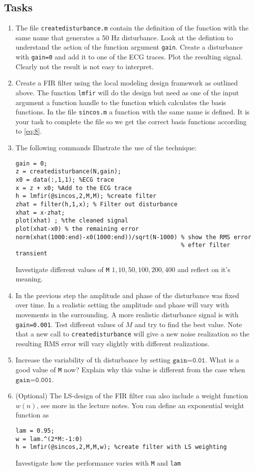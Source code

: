 \documentclass[12pt]{article}
\begin{document}
\subsection{Tasks}
\label{sec:tasks-1}
\begin{enumerate}
\item The file \texttt{createdisturbance.m} contain the definition of the
function with the same name that generates a 50 Hz disturbance. Look
at the defintion to understand the action of the function argument
\texttt{gain}. Create a disturbance with \texttt{gain=0}  and add
it to one of the ECG traces. Plot the resulting signal. Clearly not
the result is not easy to interpret. 
\item Create a FIR filter using the local modeling design framework as
  outlined above. The function \texttt{lmfir} will do the design but
  need as one of the input argument a function handle to the function
  which calculates the basis functions. In the file \texttt{sincos.m}
  a function with the same name is defined. It is your task to
  complete the file so we get the correct basis functions according to
  \eqref{eq:8}. 
\item The following commands Illustrate the use of the technique:
\begin{verbatim}
gain = 0;
z = createdisturbance(N,gain);
x0 = data(:,1,1); %ECG trace
x = z + x0; %Add to the ECG trace
h = lmfir(@sincos,2,M,M); %create filter
zhat = filter(h,1,x); % Filter out disturbance
xhat = x-zhat;
plot(xhat) ; %the cleaned signal
plot(xhat-x0) % the remaining error 
norm(xhat(1000:end)-x0(1000:end))/sqrt(N-1000) % show the RMS error 
                                               % efter filter transient
\end{verbatim}
Investigate different values of \texttt{M} $1,10,50,100,200,400$ and reflect on it's
meaning.
\item In the previous step the amplitude and phase of the disturbance
  was fixed over time. In a realistic setting the amplitude and phase
  will vary with movements in the surrounding. A more realistic
  disturbance signal is with \texttt{gain=0.001}. Test different
  values of $M$ and try to find the best value. Note that a new call
  to \texttt{createdisturbance} will give a new noise realization so
  the resulting RMS error will vary slightly with different realizations.
\item Increase the variability of th disturbance by setting
  $\texttt{gain=0.01}$. What is a good value of \texttt{M} now?
  Explain why this value is different from the case when
  $\texttt{gain=0.001}$.
\item (Optional) The LS-design of the FIR filter can also include a weight
  function $w(n)$, see more in the lecture notes. You can define an
  exponential weight function as
\begin{verbatim}
lam = 0.95;
w = lam.^(2*M:-1:0)
h = lmfir(@sincos,2,M,M,w); %create filter with LS weighting
\end{verbatim}
  Investigate how the performance varies with \texttt{M} and \texttt{lam}


\end{enumerate}
\end{document}
